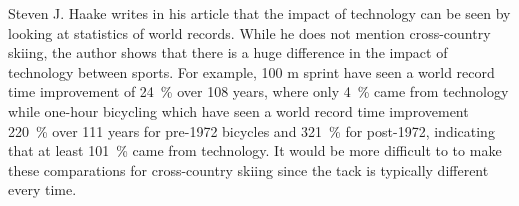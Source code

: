 \documentclass[12pt,a4paper]{IEEEtran}
\begin{document}
Steven J. Haake writes in his article that the impact of technology can be seen by looking at statistics of world records.
While he does not mention cross-country skiing, the author shows that there is a huge difference in the impact of technology between sports.
For example, 100 m sprint have seen a world record time improvement of 24~\% over 108 years, where only 4~\% came from technology while one-hour bicycling which have seen a world record time improvement 220~\% over 111 years for pre-1972 bicycles and 321~\% for post-1972, indicating that at least 101~\% came from technology.
It would be more difficult to to make these comparations for cross-country skiing since the tack is typically different every time.
\end{document}
